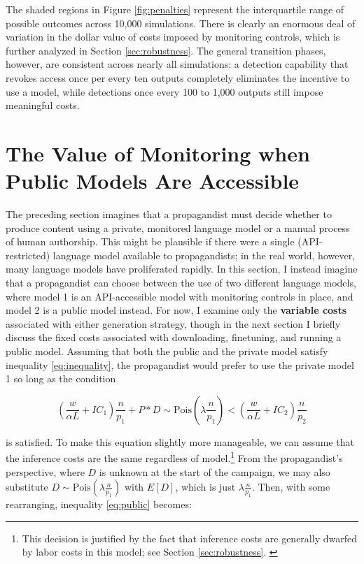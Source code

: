 \documentclass{article}
\begin{document}
The shaded regions in Figure \ref{fig:penalties} represent the interquartile range of possible outcomes across 10,000 simulations. There is clearly an enormous deal of variation in the dollar value of costs imposed by monitoring controls, which is further analyzed in Section \ref{sec:robustness}. The general transition phases, however, are consistent across nearly all simulations: a detection capability that revokes access once per every ten outputs completely eliminates the incentive to use a model, while detections once every 100 to 1,000 outputs still impose meaningful costs. 

\section{The Value of Monitoring when Public Models Are Accessible}
\label{sec:comparison}

The preceding section imagines that a propagandist must decide whether to produce content using a private, monitored language model or a manual process of human authorship. This might be plausible if there were a single (API-restricted) language model available to propagandists; in the real world, however, many language models have proliferated rapidly. \cite{workshop, solaiman} In this section, I instead imagine that a propagandist can choose between the use of two different language models, where model 1 is an API-accessible model with monitoring controls in place, and model 2 is a public model instead. For now, I examine only the \textbf{variable costs} associated with either generation strategy, though in the next section I briefly discuss the fixed costs associated with downloading, finetuning, and running a public model. Assuming that both the public and the private model satisfy inequality \ref{eq:inequality}, the propagandist would prefer to use the private model 1 so long as the condition 

\begin{equation}
  \label{eq:public}
  \left( \frac{w}{\alpha L} + IC_1 \right) \frac{n}{p_1} + P * D \sim \text{Pois}\left( \lambda \frac{n}{p_1} \right) < \left( \frac{w}{\alpha L} + IC_2 \right) \frac{n}{p_2}
\end{equation}

is satisfied. To make this equation slightly more manageable, we can assume that the inference costs are the same regardless of model.\footnote{This decision is justified by the fact that inference costs are generally dwarfed by labor costs in this model; see Section \ref{sec:robustness}. \label{icequivalent}} From the propagandist's perspective, where $D$ is unknown at the start of the campaign, we may also substitute $D \sim \text{Pois}\left( \lambda \frac{n}{p_1} \right)$ with $E[D]$, which is just $\lambda \frac{n}{p_1}$. Then, with some rearranging, inequality \ref{eq:public} becomes:
\end{document}
